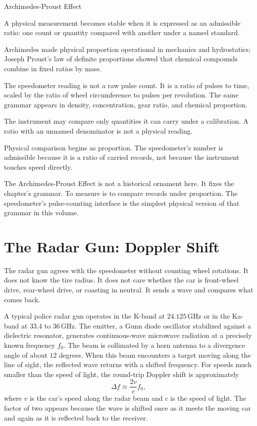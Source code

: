 \begin{phenom}{Archimedes-Proust Effect}
\label{ph:archimedes-proust-effect}

\PhStatement A physical measurement becomes stable when it is expressed as an
admissible ratio: one count or quantity compared with another under a named
standard.

\PhOrigin Archimedes made physical proportion operational in mechanics and
hydrostatics; Joseph Proust's law of definite proportions showed that chemical
compounds combine in fixed ratios by mass.

\PhObservation The speedometer reading is not a raw pulse count. It is a ratio
of pulses to time, scaled by the ratio of wheel circumference to pulses per
revolution. The same grammar appears in density, concentration, gear ratio, and
chemical proportion.

\PhConstraint The instrument may compare only quantities it can carry under a
calibration. A ratio with an unnamed denominator is not a physical reading.

\PhConsequence Physical comparison begins as proportion. The speedometer's
number is admissible because it is a ratio of carried records, not because the
instrument touches speed directly.

\end{phenom}

The Archimedes-Proust Effect is not a historical ornament here. It fixes the
chapter's grammar. To measure is to compare records under proportion. The
speedometer's pulse-counting interface is the simplest physical version of that
grammar in this volume.

\section{The Radar Gun: Doppler Shift}
\label{se:the-radar-gun-doppler-shift}

The radar gun agrees with the speedometer without counting wheel rotations. It
does not know the tire radius. It does not care whether the car is front-wheel
drive, rear-wheel drive, or coasting in neutral. It sends a wave and compares
what comes back.

A typical police radar gun operates in the K-band at $24{.}125\,\mathrm{GHz}$
or in the Ka-band at $33{.}4$ to $36\,\mathrm{GHz}$. The emitter, a Gunn
diode oscillator stabilized against a dielectric resonator, generates
continuous-wave microwave radiation at a precisely known frequency $f_0$. The
beam is collimated by a horn antenna to a divergence angle of about $12$
degrees. When this beam encounters a target moving along the line of sight,
the reflected wave returns with a shifted frequency. For speeds much smaller
than the speed of light, the round-trip Doppler shift is approximately
\[
\Delta f \approx \frac{2v}{c} f_0,
\]
where $v$ is the car's speed along the radar beam and $c$ is the speed of
light. The factor of two appears because the wave is shifted once as it meets
the moving car and again as it is reflected back to the receiver.

